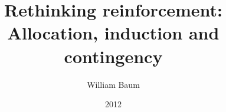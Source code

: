 \documentclass[a4paper,12pt]{article}
\title{Rethinking reinforcement: Allocation, induction and contingency}
\author{William Baum}
\date{2012}
\begin{document}
{\scshape\bfseries \maketitle}
\end{document}
